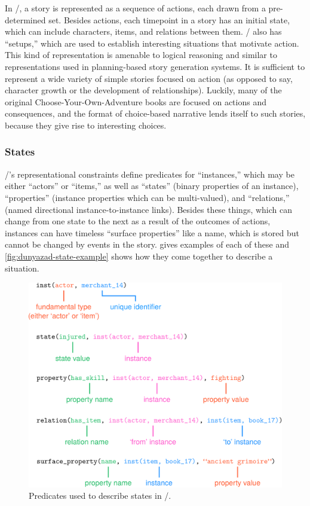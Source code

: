 In \dunyazad/, a story is represented as a sequence of actions, each drawn from a pre-determined set.
%
Besides actions, each timepoint in a story has an initial state, which can include characters, items, and relations between them.
%
\dunyazad/ also has ``setups,'' which are used to establish interesting situations that motivate action.
%
This kind of representation is amenable to logical reasoning and similar to representations used in planning-based story generation systems.
%
It is sufficient to represent a wide variety of simple stories focused on action (as opposed to say, character growth or the development of relationships).
%
Luckily, many of the original Choose-Your-Own-Adventure books are focused on actions and consequences, and the format of choice-based narrative lends itself to such stories, because they give rise to interesting choices.


\subsubsection{States}

\dunyazad/'s representational constraints define predicates for ``instances,'' which may be either ``actors'' or ``items,'' as well as ``states'' (binary properties of an instance), ``properties'' (instance properties which can be multi-valued), and ``relations,'' (named directional instance-to-instance links).
%
Besides these things, which can change from one state to the next as a result of the outcomes of actions, instances can have timeless ``surface properties'' like a name, which is stored but cannot be changed by events in the story.
%
 gives examples of each of these and \cref{fig:dunyazad-state-example} shows how they come together to describe a situation.


\begin{figure}[!t]
\includegraphics[width=\textwidth]{fig/cropped-dunyazad-states.pdf}
\caption[\dunyazad/'s state predicates]{Predicates used to describe states in \dunyazad/.}
\label{fig:dunyazad-states}
\end{figure}


